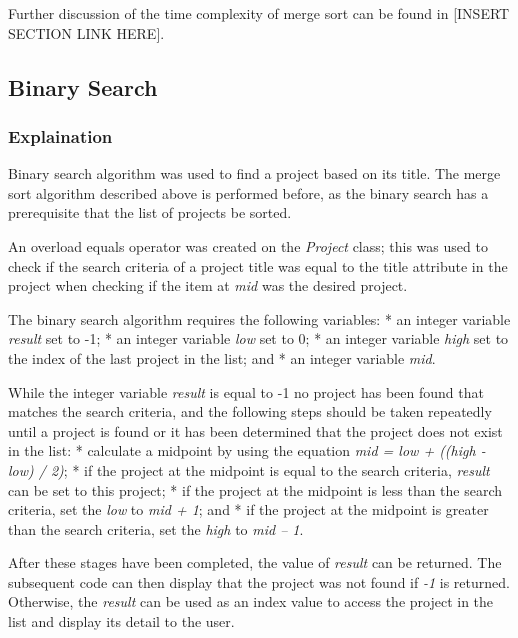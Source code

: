 \documentclass[
  english,
  a4paper,
,tablecaptionabove
]{scrartcl}
\begin{document}
Further discussion of the time complexity of merge sort can be found in
{[}INSERT SECTION LINK HERE{]}.

\hypertarget{binary-search}{%
\subsection{Binary Search}\label{binary-search}}

\hypertarget{explaination-1}{%
\subsubsection{Explaination}\label{explaination-1}}

Binary search algorithm was used to find a project based on its title.
The merge sort algorithm described above is performed before, as the
binary search has a prerequisite that the list of projects be sorted.

An overload equals operator was created on the \emph{Project} class;
this was used to check if the search criteria of a project title was
equal to the title attribute in the project when checking if the item at
\emph{mid} was the desired project.

The binary search algorithm requires the following variables: * an
integer variable \emph{result} set to -1; * an integer variable
\emph{low} set to 0; * an integer variable \emph{high} set to the index
of the last project in the list; and * an integer variable \emph{mid}.

While the integer variable \emph{result} is equal to -1 no project has
been found that matches the search criteria, and the following steps
should be taken repeatedly until a project is found or it has been
determined that the project does not exist in the list: * calculate a
midpoint by using the equation \emph{mid = low + ((high - low) / 2)}; *
if the project at the midpoint is equal to the search criteria,
\emph{result} can be set to this project; * if the project at the
midpoint is less than the search criteria, set the \emph{low} to
\emph{mid + 1}; and * if the project at the midpoint is greater than the
search criteria, set the \emph{high} to \emph{mid -- 1}.

After these stages have been completed, the value of \emph{result} can
be returned. The subsequent code can then display that the project was
not found if \emph{-1} is returned. Otherwise, the \emph{result} can be
used as an index value to access the project in the list and display its
detail to the user.
\end{document}
